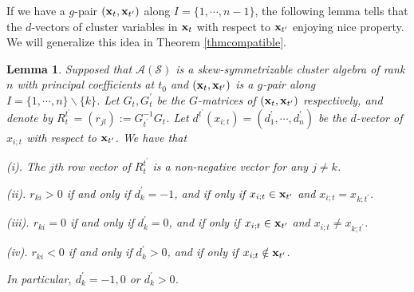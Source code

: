 \documentclass[14pt]{amsart}
\newtheorem{Lemma}[Theorem]{Lemma}
\begin{document}
If we have a $g$-pair  $({\bf x}_t,{\bf x}_{t^\prime})$ along $I=\{1,\cdots,n-1\}$, the following lemma tells that the $d$-vectors of cluster variables in ${\bf x}_t$ with respect to ${\bf x}_{t^\prime}$ enjoying nice property. We will generalize this idea in Theorem \ref{thmcompatible}.



\begin{Lemma}\label{lemdv}
 Supposed that $\mathcal A(\mathcal S)$ is a skew-symmetrizable cluster algebra of rank $n$ with principal coefficients at $t_0$ and $({\bf x}_t,{\bf x}_{t^\prime})$  is a $g$-pair along $I=\{1,\cdots,n\}\backslash \{k\}$. Let $G_t, G_t^{\prime}$ be the $G$-matrices of  $({\bf x}_t,{\bf x}_{t^\prime})$ respectively, and denote by $R_{t}^{t^\prime}=(r_{jl}):=G_{t^{\prime}}^{-1}G_t$. Let $d^{t^\prime}(x_{i;t})=(d_{1}^\prime,\cdots,d_{n}^\prime)$ be the $d$-vector of $x_{i;t}$ with respect to ${\bf x}_{t^\prime}$. We have that

 (i). The $j$th row vector of $R_{t}^{t^\prime}$ is a non-negative vector for any $j\neq k$.


(ii). $r_{ki}>0$ if and only if $d_{k}^\prime=-1$,  and  if only if $x_{i;t}\in{\bf x}_{t^\prime}$ and $x_{i;t}=x_{k;t^\prime}$.

(iii). $r_{ki}=0$ if and only if $d_{k}^\prime=0$,  and if only if $x_{i;t}\in{\bf x}_{t^\prime}$ and $x_{i;t}\neq x_{k;t^\prime}$.

(iv). $r_{ki}<0$ if and only if $d_{k}^\prime>0$,  and if only if $x_{i;t}\notin{\bf x}_{t^\prime}$.

In particular, $d_{k}^\prime=-1,0$ or  $d_{k}^\prime>0$.
\end{Lemma}
\end{document}
